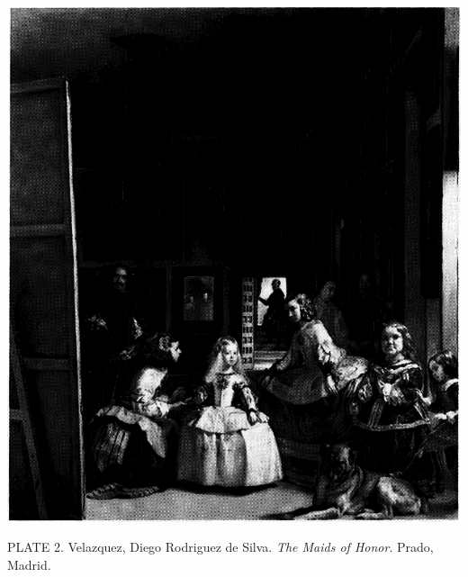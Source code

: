 \protect\hypertarget{20_ILLUSTRATIONS_FOLLOW_PAGE.xhtmlux5cux23id_3}{}{}\includegraphics{include/html/images/323_1.png}

PLATE 2. Velazquez, Diego Rodriguez de Silva. \emph{The Maids of Honor}.
Prado, Madrid.

